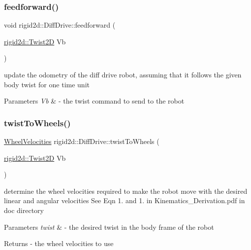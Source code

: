 \subsubsection{\texorpdfstring{feedforward()}{feedforward()}}
{\footnotesize\ttfamily void rigid2d\+::\+Diff\+Drive\+::feedforward (\begin{DoxyParamCaption}\item[{\hyperlink{classrigid2d_1_1Twist2D}{rigid2d\+::\+Twist2D}}]{Vb }\end{DoxyParamCaption})}



update the odometry of the diff drive robot, assuming that it follows the given body twist for one time unit 


\begin{DoxyParams}{Parameters}
{\em Vb} & -\/ the twist command to send to the robot \\
\hline
\end{DoxyParams}
\mbox{\label{classrigid2d_1_1DiffDrive_ae9ca2df976d1fed87addd110e28a8eb1}} 
\subsubsection{\texorpdfstring{twist\+To\+Wheels()}{twistToWheels()}}
{\footnotesize\ttfamily \hyperlink{structrigid2d_1_1WheelVelocities}{Wheel\+Velocities} rigid2d\+::\+Diff\+Drive\+::twist\+To\+Wheels (\begin{DoxyParamCaption}\item[{\hyperlink{classrigid2d_1_1Twist2D}{rigid2d\+::\+Twist2D}}]{Vb }\end{DoxyParamCaption})}



determine the wheel velocities required to make the robot move with the desired linear and angular velocities See Eqn 1. and 1. in Kinematics\+\_\+\+Derivation.\+pdf in doc directory 


\begin{DoxyParams}{Parameters}
{\em twist} & -\/ the desired twist in the body frame of the robot \\
\hline
\end{DoxyParams}
\begin{DoxyReturn}{Returns}
-\/ the wheel velocities to use 
\end{DoxyReturn}

